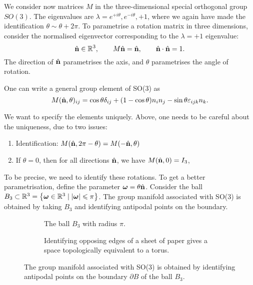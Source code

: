 \begin{example}[$SO(3)$]
  We consider now matrices $M$ in the three-dimensional special orthogonal group $SO(3)$. The eigenvalues are $\lambda = e^{+i \theta}, e^{-i\theta}, +1$, where we again have made the identification $\theta \sim \theta + 2\pi$.
  To parametrise a rotation matrix in three dimensions, consider the normalised eigenvector corresponding to the  $\lambda = +1$ eigenvalue:
  \begin{equation}
    \hat{\vb{n}} \in \mathbb{R}^3, \qquad M \hat{\vb{n}} = \hat{\vb{n}}, \qquad \hat{\vb{n}} \cdot \hat{\vb{n}} = 1.
  \end{equation}
  The direction of $\hat{\vb{n}}$ parametrises the axis, and $\theta$ parametrises the angle of rotation.

  \begin{exercise}
    One can write a general group element of SO(3) as
    \begin{equation}
      M(\hat{\vb{n}}, \theta)_{ij} = \cos\theta \delta_{ij} + (1 - \cos\theta) n_i n_j - \sin\theta \varepsilon_{ijk} n_k.
    \end{equation}
  \end{exercise}

  We want to specify the elements uniquely. Above, one needs to be careful about the uniqueness, due to two issues:
  \begin{enumerate}
    \item Identification: $M(\hat{\vb{n}}, 2\pi - \theta) = M(-\hat{\vb{n}}, \theta)$
    \item If $\theta = 0$, then for all directions $\hat{\vb{n}}$, we have $M(\hat{\vb{n}}, 0) = I_3$,
  \end{enumerate}

  To be precise, we need to identify these rotations. To get a better parametrisation, define the parameter $\boldsymbol\omega = \theta \hat{\vb{n}}$.
  Consider the ball $B_3 \subset \mathbb{R}^3 = \left\{ \boldsymbol\omega \in \mathbb{R}^3 \mid \abs{\boldsymbol\omega} \leqslant \pi \right\}$.
  The group manifold associated with SO(3) is obtained by taking $B_3$ and identifying antipodal points on the boundary.

  \begin{figure}[tbph]
    \centering
    \begin{subfigure}[t]{0.3\linewidth}
      \centering
      \def\svgwidth{0.8\columnwidth}
      
      \caption{The ball $B_3$ with radius $\pi$.}
      \label{fig:ball}
    \end{subfigure}\qquad
    \begin{subfigure}[t]{0.6\linewidth}
      \centering
      \def\svgwidth{\columnwidth}
      
      \caption{Identifying opposing edges of a sheet of paper gives a space topologically equivalent to a torus.}
      \label{fig:identification}
    \end{subfigure}
    \caption{The group manifold associated with SO(3) is obtained by identifying antipodal points on the boundary $\partial B$ of the ball $B_3$.}
  \end{figure}


\end{example}
